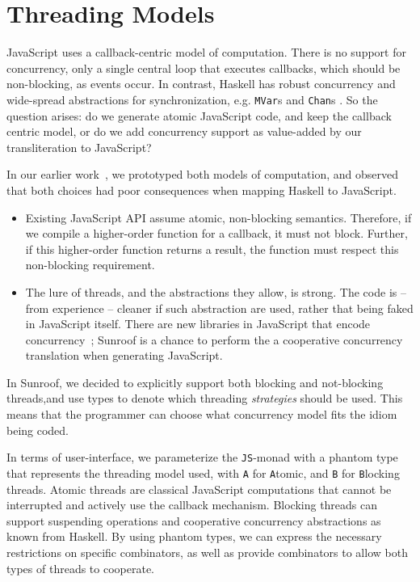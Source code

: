 \documentclass{llncs}
\newcommand{\Src}[1]{{\tt{#1}}}
\newcommand{\JS}{\Src{JS}}
\begin{document}


\section{Threading Models}
\label{sec:threading-models}

JavaScript uses a callback-centric model of computation. There
is no support for concurrency, only a single central loop that executes
callbacks, which should be non-blocking, as events occur.
In contrast, Haskell has robust concurrency and wide-spread 
abstractions for synchronization, e.g. \Src{MVar}s and \Src{Chan}s
\cite{Jones:96:ConcurrentHaskell}.
So the question arises: do we generate atomic JavaScript code, 
and keep the callback centric model, or do we add concurrency
support as value-added by our transliteration to JavaScript?

In our earlier work~\cite{...}, we prototyped both models
of computation, and observed that both choices had poor consequences
when mapping Haskell to JavaScript.
\begin{itemize}
\item Existing JavaScript API assume atomic, non-blocking
semantics. Therefore, if we compile a higher-order function
for a callback, it must not block. 
Further, if this higher-order function returns a result, 
the function must respect this non-blocking requirement.
\item The lure of threads, and the abstractions they allow, 
is strong. The code is -- from experience -- cleaner if such abstraction
are used, rather that being faked in JavaScript itself.
There are new libraries in JavaScript that encode
concurrency~\cite{...}; Sunroof is a chance to
perform the a cooperative concurrency translation
when generating JavaScript.
\end{itemize}
In Sunroof, we decided to explicitly support both blocking
and not-blocking threads,and use types to denote which
threading {\em strategies\/} should be used.
This means that the programmer can choose what concurrency model fits
the idiom being coded.

In terms of user-interface, we parameterize the \JS-monad
with a phantom type that represents the threading model used, 
with \Src{A} for \Src{A}tomic,
and \Src{B} for \Src{B}locking threads. 
Atomic threads are classical JavaScript computations that
cannot be interrupted and actively use the callback
mechanism. Blocking threads can
support suspending operations and cooperative concurrency
abstractions as known from Haskell. By using phantom
types, we can express the necessary
restrictions on specific combinators, as well
as provide combinators to allow both types of
threads to cooperate.
\end{document}
